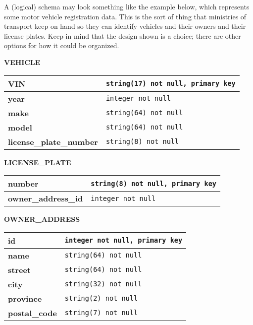 A (logical) schema may look something like the example below, which represents some motor vehicle registration data. This is the sort of thing that ministries of transport keep on hand so they can identify vehicles and their owners and their license plates. Keep in mind that the design shown is a choice; there are other options for how it could be organized.
\vspace{1em}
\begin{center}
	\textbf{VEHICLE}\\
	\begin{tabular}{|l|l|}\hline
		\textbf{VIN} & \texttt{string(17) not null, primary key}\\ \hline		
		\textbf{year} & \texttt{integer not null}\\ \hline
		\textbf{make} & \texttt{string(64) not null}\\ \hline
		\textbf{model} & \texttt{string(64) not null}\\ \hline		
		\textbf{license\_plate\_number} & \texttt{string(8) not null}\\ \hline		
	\end{tabular}
	
	\textbf{LICENSE\_PLATE}\\
	\begin{tabular}{|l|l|}\hline
		\textbf{number} & \texttt{string(8) not null, primary key}\\ \hline
		\textbf{owner\_address\_id} & \texttt{integer not null}\\ \hline		
	\end{tabular}
	
		\textbf{OWNER\_ADDRESS}\\
	\begin{tabular}{|l|l|}\hline
		\textbf{id} & \texttt{integer not null,  primary key}\\ \hline
		\textbf{name} & \texttt{string(64) not null}\\ \hline
		\textbf{street} & \texttt{string(64) not null}\\ \hline
		\textbf{city} & \texttt{string(32) not null}\\ \hline
		\textbf{province} & \texttt{string(2) not null}\\ \hline
		\textbf{postal\_code} & \texttt{string(7) not null}\\ \hline

	\end{tabular}
\end{center}

